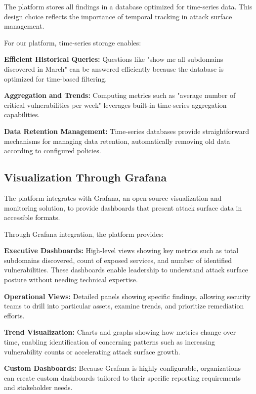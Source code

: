\documentclass[a4paper,12pt]{report}
\begin{document}
The platform stores all findings in a database optimized for time-series data. This design choice reflects the importance of temporal tracking in attack surface management.\hfill \break

For our platform, time-series storage enables:\hfill \break

\textbf{Efficient Historical Queries:} Questions like "show me all subdomains discovered in March" can be answered efficiently because the database is optimized for time-based filtering.\hfill \break

\textbf{Aggregation and Trends:} Computing metrics such as "average number of critical vulnerabilities per week" leverages built-in time-series aggregation capabilities.\hfill \break

\textbf{Data Retention Management:} Time-series databases provide straightforward mechanisms for managing data retention, automatically removing old data according to configured policies.\hfill \break

\subsection{Visualization Through Grafana}

The platform integrates with Grafana, an open-source visualization and monitoring solution, to provide dashboards that present attack surface data in accessible formats.\hfill \break

Through Grafana integration, the platform provides:\hfill \break

\textbf{Executive Dashboards:} High-level views showing key metrics such as total subdomains discovered, count of exposed services, and number of identified vulnerabilities. These dashboards enable leadership to understand attack surface posture without needing technical expertise.\hfill \break

\textbf{Operational Views:} Detailed panels showing specific findings, allowing security teams to drill into particular assets, examine trends, and prioritize remediation efforts.\hfill \break

\textbf{Trend Visualization:} Charts and graphs showing how metrics change over time, enabling identification of concerning patterns such as increasing vulnerability counts or accelerating attack surface growth.\hfill \break

\textbf{Custom Dashboards:} Because Grafana is highly configurable, organizations can create custom dashboards tailored to their specific reporting requirements and stakeholder needs.\hfill \break
\end{document}
